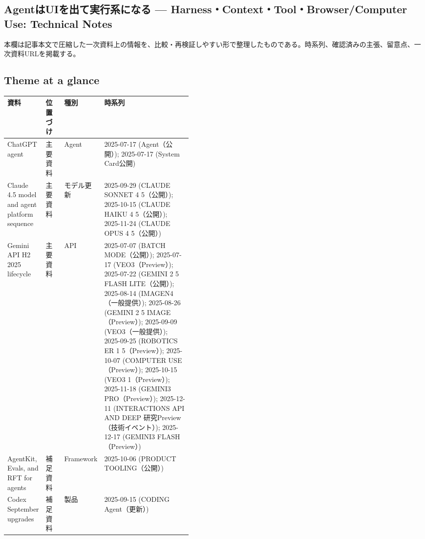 \subsection*{AgentはUIを出て実行系になる — Harness・Context・Tool・Browser/Computer Use: Technical Notes}
本欄は記事本文で圧縮した一次資料上の情報を、比較・再検証しやすい形で整理したものである。時系列、確認済みの主張、留意点、一次資料URLを掲載する。
\medskip
\subsection*{Theme at a glance}
\begin{center}
\footnotesize
\begin{tabularx}{\linewidth}{@{}p{0.20\linewidth}p{0.10\linewidth}p{0.14\linewidth}X@{}}
\toprule
資料 & 位置づけ & 種別 & 時系列 \\
\midrule
ChatGPT agent & 主要資料 & Agent & 2025-07-17 (Agent（公開）); 2025-07-17 (System Card公開)  \\
Claude 4.5 model and agent platform sequence & 主要資料 & モデル更新 & 2025-09-29 (CLAUDE SONNET 4 5（公開）); 2025-10-15 (CLAUDE HAIKU 4 5（公開）); 2025-11-24 (CLAUDE OPUS 4 5（公開）)  \\
Gemini API H2 2025 lifecycle & 主要資料 & API & 2025-07-07 (BATCH MODE（公開）); 2025-07-17 (VEO3（Preview）); 2025-07-22 (GEMINI 2 5 FLASH LITE（公開）); 2025-08-14 (IMAGEN4（一般提供）); 2025-08-26 (GEMINI 2 5 IMAGE（Preview）); 2025-09-09 (VEO3（一般提供）); 2025-09-25 (ROBOTICS ER 1 5（Preview）); 2025-10-07 (COMPUTER USE（Preview）); 2025-10-15 (VEO3 1（Preview）); 2025-11-18 (GEMINI3 PRO（Preview）); 2025-12-11 (INTERACTIONS API AND DEEP 研究Preview（技術イベント）); 2025-12-17 (GEMINI3 FLASH（Preview）)  \\
AgentKit, Evals, and RFT for agents & 補足資料 & Framework & 2025-10-06 (PRODUCT TOOLING（公開）)  \\
Codex September upgrades & 補足資料 & 製品 & 2025-09-15 (CODING Agent（更新）)  \\
\bottomrule
\end{tabularx}
\end{center}
\normalsize

